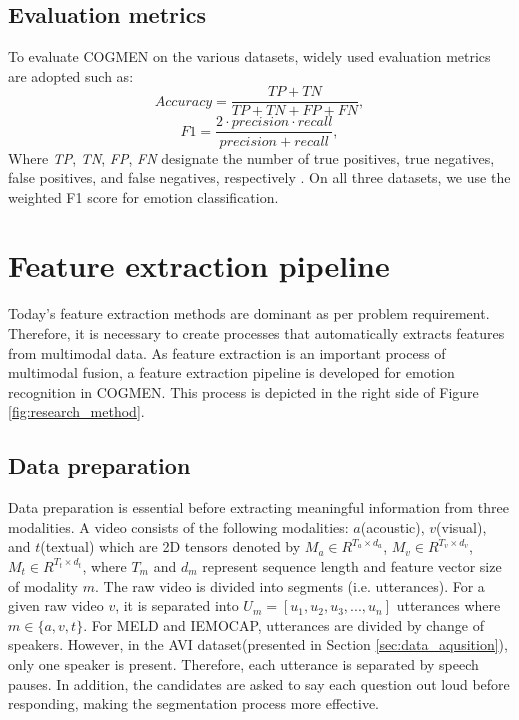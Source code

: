 \subsection{Evaluation metrics}
To evaluate COGMEN on the various datasets, widely used evaluation metrics are adopted such as:
%
\begin{equation*}
    Accuracy = \frac{TP+TN}{TP+TN+FP+FN},\tag{15}
\end{equation*}
%
\begin{equation*}
    F1 = \frac{2 \cdot precision \cdot recall}{precision + recall},\tag{16}
\end{equation*}
%
Where \textit{TP}, \textit{TN}, \textit{FP}, \textit{FN} designate the number of true positives, true negatives, false positives, and false negatives, respectively \cite{HP_Advanced}. On all three datasets, we use the weighted F1 score for emotion classification. 

\section{Feature extraction pipeline}
\label{sec:feature_extraction}
Today's feature extraction methods are dominant as per problem requirement. Therefore, it is necessary to create processes that automatically extracts features from multimodal data. As feature extraction is an important process of multimodal fusion, a feature extraction pipeline is developed for emotion recognition in COGMEN. This process is depicted in the right side of Figure \ref{fig:research_method}. 

\subsection{Data preparation}
Data preparation is essential before extracting meaningful information from three modalities. A video consists of the following modalities: $a$(acoustic), $v$(visual), and $t$(textual) which are 2D tensors denoted by $M_{a} \in R^{T_{a} \times d_{a}}$, $M_{v} \in R^{T_{v} \times d_{v}}$, $M_{t} \in R^{T_{t} \times d_{t}}$, where $T_{m}$ and $d_{m}$ represent sequence length and feature vector size of modality $m$. The raw video is divided into segments (i.e. utterances). For a given raw video $v$, it is separated into $U_{m} = [u_{1}, u_{2}, u_{3}, ..., u_{n}]$ utterances where $m\in\{a, v, t\}$. For MELD and IEMOCAP, utterances are divided by change of speakers. However, in the AVI dataset(presented in Section \ref{sec:data_aqusition}), only one speaker is present. Therefore, each utterance is separated by speech pauses. In addition, the candidates are asked to say each question out loud before responding, making the segmentation process more effective. 

